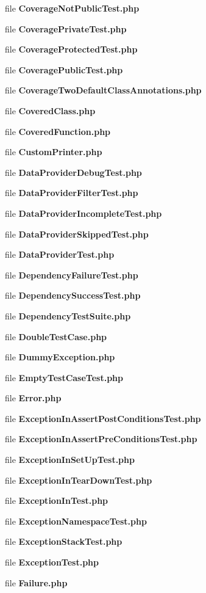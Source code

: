 \begin{DoxyCompactItemize}
\item 
file {\bf Coverage\+Not\+Public\+Test.\+php}
\item 
file {\bf Coverage\+Private\+Test.\+php}
\item 
file {\bf Coverage\+Protected\+Test.\+php}
\item 
file {\bf Coverage\+Public\+Test.\+php}
\item 
file {\bf Coverage\+Two\+Default\+Class\+Annotations.\+php}
\item 
file {\bf Covered\+Class.\+php}
\item 
file {\bf Covered\+Function.\+php}
\item 
file {\bf Custom\+Printer.\+php}
\item 
file {\bf Data\+Provider\+Debug\+Test.\+php}
\item 
file {\bf Data\+Provider\+Filter\+Test.\+php}
\item 
file {\bf Data\+Provider\+Incomplete\+Test.\+php}
\item 
file {\bf Data\+Provider\+Skipped\+Test.\+php}
\item 
file {\bf Data\+Provider\+Test.\+php}
\item 
file {\bf Dependency\+Failure\+Test.\+php}
\item 
file {\bf Dependency\+Success\+Test.\+php}
\item 
file {\bf Dependency\+Test\+Suite.\+php}
\item 
file {\bf Double\+Test\+Case.\+php}
\item 
file {\bf Dummy\+Exception.\+php}
\item 
file {\bf Empty\+Test\+Case\+Test.\+php}
\item 
file {\bf Error.\+php}
\item 
file {\bf Exception\+In\+Assert\+Post\+Conditions\+Test.\+php}
\item 
file {\bf Exception\+In\+Assert\+Pre\+Conditions\+Test.\+php}
\item 
file {\bf Exception\+In\+Set\+Up\+Test.\+php}
\item 
file {\bf Exception\+In\+Tear\+Down\+Test.\+php}
\item 
file {\bf Exception\+In\+Test.\+php}
\item 
file {\bf Exception\+Namespace\+Test.\+php}
\item 
file {\bf Exception\+Stack\+Test.\+php}
\item 
file {\bf Exception\+Test.\+php}
\item 
file {\bf Failure.\+php}
\item 

\end{DoxyCompactItemize}
